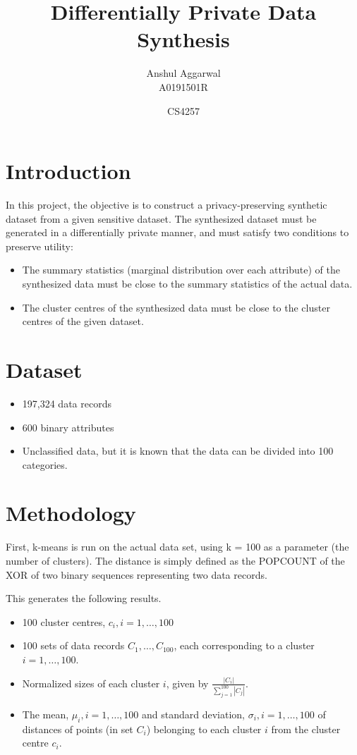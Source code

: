 \documentclass[]{article}
\title{Differentially Private Data Synthesis}
\author{Anshul Aggarwal\\A0191501R}
\date{CS4257}
\begin{document}
\maketitle

\section{Introduction}

In this project, the objective is to construct a privacy-preserving synthetic dataset from a given sensitive dataset. The synthesized dataset must be generated in a differentially private manner, and must satisfy two conditions to preserve utility:

\begin{itemize}
    \item The summary statistics (marginal distribution over each attribute) of the synthesized data must be close to the summary statistics of the actual data.
    \item The cluster centres of the synthesized data must be close to the cluster centres of the given dataset.
\end{itemize}

\section{Dataset}

\begin{itemize}
    \item 197,324 data records
    \item 600 binary attributes
    \item Unclassified data, but it is known that the data can be divided into 100 categories.
\end{itemize}

\section{Methodology}

First, k-means is run on the actual data set, using k = 100 as a parameter (the number of clusters). The distance is simply defined as the POPCOUNT of the XOR of two binary sequences representing two data records.

This generates the following results.

\begin{itemize}
    \item 100 cluster centres, $c_i, i = 1, \dots, 100$
    \item 100 sets of data records $C_1, \dots, C_{100}$, each corresponding to a cluster $i = 1, \dots, 100$.
    \item Normalized sizes of each cluster $i$, given by $\frac{|C_i|}{\sum_{j=1}^{100} |C_j|}$.
    \item The mean, $\mu_i, i = 1, \dots, 100$ and standard deviation, $\sigma_i, i = 1, \dots, 100$ of distances of points (in set $C_i$) belonging to each cluster $i$ from the cluster centre $c_i$.
\end{itemize} 
\end{document}
